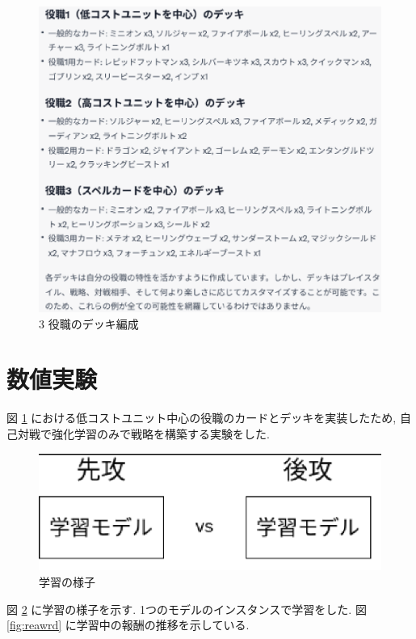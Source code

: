 \documentclass{jarticle}     %
\begin{document}
\begin{figure}[ht]
  \centering
  \includegraphics[width=120mm]{assets/5.eps}
  \vspace{-0.3cm}
  \caption{3 役職のデッキ編成}
  \label{fig:deck5}
\end{figure}


\section{数値実験}

図 \ref{fig:deck5} における低コストユニット中心の役職のカードとデッキを実装したため, 自己対戦で強化学習のみで戦略を構築する実験をした.

\begin{figure}[ht]
  \centering
  \includegraphics[width=120mm]{assets/training.eps}
  \vspace{-0.3cm}
  \caption{学習の様子}
  \label{fig:training}
\end{figure}

図 \ref{fig:training} に学習の様子を示す. 1つのモデルのインスタンスで学習をした.
図 \ref{fig:reawrd} に学習中の報酬の推移を示している.
\end{document}
